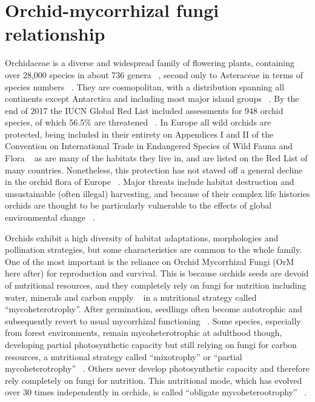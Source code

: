 \chapter{Orchid-mycorrhizal fungi relationship}
\label{orchid-mycorrhizalfungirelationship}

Orchidaceae is a diverse and widespread family of flowering plants, containing over 28,000 species in about 736 genera ~\citep{christenhusz2016}, second only to Asteraceae in terms of species numbers ~\citep{ramirez2007}. They are cosmopolitan, with a distribution spanning all continents except Antarctica and including most major island groups ~\citep{givnish2016}.
By the end of 2017 the IUCN Global Red List included assessments for 948 orchid species, of which 56.5\% are threatened ~\citep{fay2018}. In Europe all wild orchids are protected, being included in their entirety on Appendices I and II of the Convention on International Trade in Endangered Species of Wild Fauna and Flora ~\citep{CITES-1} as are many of the habitats they live in, and are listed on the Red List of many countries. Nonetheless, this protection has not staved off a general decline in the orchid flora of Europe ~\citep{jacquemyn2005, kull2006}. Major threats include habitat destruction and unsustainable (often illegal) harvesting, and because of their complex life histories orchids are thought to be particularly vulnerable to the effects of global environmental change ~\citep{kull2016, gale2018}.

Orchids exhibit a high diversity of habitat adaptations, morphologies and pollination strategies, but some characteristics are common to the whole family. One of the most important is the reliance on Orchid Mycorrhizal Fungi (OrM here after) for reproduction and survival. This is because orchids seeds are devoid of nutritional resources, and they completely rely on fungi for nutrition including water, minerals and carbon supply ~\citep{leake1994, rasmussen1998, merckx2013} in a nutritional strategy called ``mycoheterotrophy''. After germination, seedlings often become autotrophic and subsequently revert to usual mycorrhizal functioning ~\citep{rasmussen1995, cameron2008}. Some species, especially from forest environments, remain mycoheterotrophic at adulthood though, developing partial photosynthetic capacity but still relying on fungi for carbon resources, a nutritional strategy called ``mixotrophy'' or ``partial mycoheterotrophy'' ~\citep{gebauer2003, julou2005, selosse2009}. Others never develop photosynthetic capacity and therefore rely completely on fungi for nutrition. This nutritional mode, which has evolved over 30 times independently in orchids, is called ``obligate mycoheterootrophy'' ~\citep{merckx2013}.

